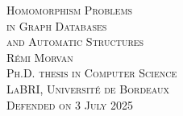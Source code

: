 \begin{titlepage}
\begin{center}
  \Huge\scshape%
  Homomorphism Problems
  \LARGE\\
  in Graph Databases\\
  and Automatic Structures\\
  \vfill
  \normalfont\LARGE{} \textsc{Rémi Morvan}\\[1em]
  \Large\scshape
  Ph.D. thesis in Computer Science\\
  \textcolor{maincolor}{LaBRI, Université de Bordeaux}\\
  \normalfont\Large\scshape Defended on 3 July 2025
\end{center}
\end{titlepage}
\restoregeometry
